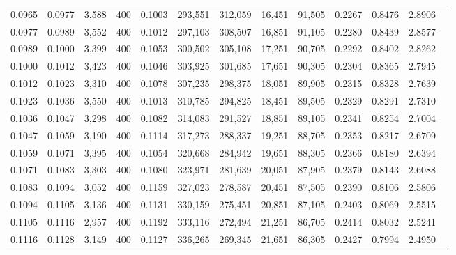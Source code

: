 \begin{tabular}{rrrrrrrrrrrrr}
0.0965 & 0.0977 &  3,588 & 400 &                                     0.1003 & 293,551 & 312,059 &  16,451 &  91,505 & 0.2267 & 0.8476 & 2.8906 \\
0.0977 & 0.0989 &  3,552 & 400 &                                     0.1012 & 297,103 & 308,507 &  16,851 &  91,105 & 0.2280 & 0.8439 & 2.8577 \\
0.0989 & 0.1000 &  3,399 & 400 &                                     0.1053 & 300,502 & 305,108 &  17,251 &  90,705 & 0.2292 & 0.8402 & 2.8262 \\
0.1000 & 0.1012 &  3,423 & 400 &                                     0.1046 & 303,925 & 301,685 &  17,651 &  90,305 & 0.2304 & 0.8365 & 2.7945 \\
0.1012 & 0.1023 &  3,310 & 400 &                                     0.1078 & 307,235 & 298,375 &  18,051 &  89,905 & 0.2315 & 0.8328 & 2.7639 \\
0.1023 & 0.1036 &  3,550 & 400 &                                     0.1013 & 310,785 & 294,825 &  18,451 &  89,505 & 0.2329 & 0.8291 & 2.7310 \\
0.1036 & 0.1047 &  3,298 & 400 &                                     0.1082 & 314,083 & 291,527 &  18,851 &  89,105 & 0.2341 & 0.8254 & 2.7004 \\
0.1047 & 0.1059 &  3,190 & 400 &                                     0.1114 & 317,273 & 288,337 &  19,251 &  88,705 & 0.2353 & 0.8217 & 2.6709 \\
0.1059 & 0.1071 &  3,395 & 400 &                                     0.1054 & 320,668 & 284,942 &  19,651 &  88,305 & 0.2366 & 0.8180 & 2.6394 \\
0.1071 & 0.1083 &  3,303 & 400 &                                     0.1080 & 323,971 & 281,639 &  20,051 &  87,905 & 0.2379 & 0.8143 & 2.6088 \\
0.1083 & 0.1094 &  3,052 & 400 &                                     0.1159 & 327,023 & 278,587 &  20,451 &  87,505 & 0.2390 & 0.8106 & 2.5806 \\
0.1094 & 0.1105 &  3,136 & 400 &                                     0.1131 & 330,159 & 275,451 &  20,851 &  87,105 & 0.2403 & 0.8069 & 2.5515 \\
0.1105 & 0.1116 &  2,957 & 400 &                                     0.1192 & 333,116 & 272,494 &  21,251 &  86,705 & 0.2414 & 0.8032 & 2.5241 \\
0.1116 & 0.1128 &  3,149 & 400 &                                     0.1127 & 336,265 & 269,345 &  21,651 &  86,305 & 0.2427 & 0.7994 & 2.4950 \\

\end{tabular}
